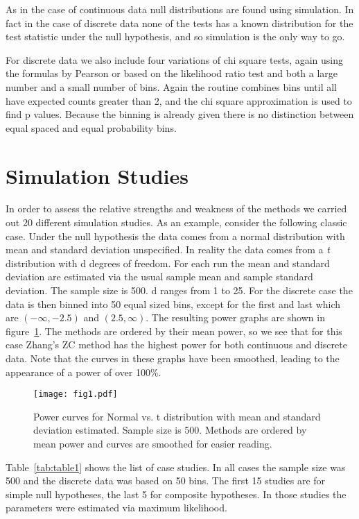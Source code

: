 \documentclass[]{svjour3}
\begin{document}
As in the case of continuous data null distributions are found using
simulation. In fact in the case of discrete data none of the tests has a
known distribution for the test statistic under the null hypothesis, and
so simulation is the only way to go.

For discrete data we also include four variations of chi square tests, again using the formulas by Pearson or
  based on the likelihood ratio test and both a large number and a small
  number of bins. Again the routine combines bins until all have
  expected counts greater than 2, and the chi square approximation is
  used to find p values. Because the binning is already given there is no distinction between equal spaced and equal probability bins.


\section{Simulation Studies}

In order to assess the relative strengths and weakness of the methods we carried out 20 different simulation studies. As an example, consider the following classic case. Under the null hypothesis the data comes from a normal distribution with mean and standard deviation unspecified. In reality the data comes from a \emph{t} distribution with d degrees of freedom. For each run the mean and standard deviation are estimated via the usual sample mean and sample standard deviation. The sample size is 500. d ranges from 1 to 25. For the discrete case the data is then binned into 50 equal sized bins, except for the first and last which are $(-\infty, -2.5)$ and $(2.5, \infty)$. The resulting power graphs are shown in figure~\ref{fig:fig1}. The methods are ordered by their mean power, so we see that for this case Zhang's ZC method has the highest power for both continuous and discrete data. Note that the curves in these graphs have been smoothed, leading to the appearance of a power of over 100\%. 

\begin{figure}
\begin{center}
\texttt{[image: fig1.pdf]}
\end{center}
\caption{Power curves for Normal vs. t distribution with mean and standard deviation estimated. Sample size is 500. Methods are ordered by mean power and curves are smoothed for easier reading.}
\label{fig:fig1}
\end{figure}

Table~\ref{tab:table1} shows the list of case studies. In all cases the sample size was 500 and the discrete data was based on 50 bins. The first 15 studies are for simple null hypotheses, the last 5 for composite hypotheses. In those studies the parameters were estimated via maximum likelihood.
\end{document}
